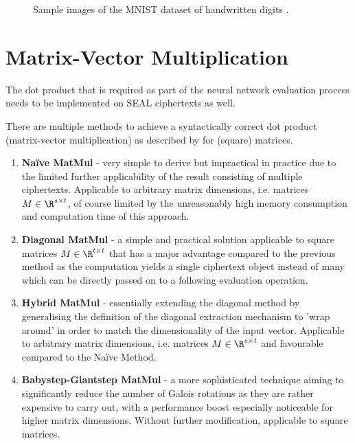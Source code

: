 \begin{figure}[H]
  \centering
  \caption{Sample images of the MNIST dataset of handwritten digits \parencite{mnist-original}.}
\end{figure}

\section{Matrix-Vector Multiplication}
The dot product that is required as part of the neural network evaluation process needs to be implemented on SEAL ciphertexts as well.

There are multiple methods to achieve a syntactically correct dot product (matrix-vector multiplication) as described by \textcite{2018-gazelle} for (square) matrices.

\begin{enumerate}
  \item \textbf{Naïve MatMul} - very simple to derive but impractical in practice due to the limited further
        applicability of the result consisting of multiple ciphertexts. Applicable to arbitrary matrix dimensions,
        i.e. matrices $M \in \R^{s \times t}$, of course limited by the unreasonably high memory consumption
        and computation time of this approach.
  \item \textbf{Diagonal MatMul} - a simple and practical solution applicable to square matrices $M \in \R^{t \times t}$
        that has a major advantage compared to the previous method as the computation yields a
        single ciphertext object instead of many which can be directly passed on to a following evaluation operation.
  \item \textbf{Hybrid MatMul} - essentially extending the diagonal method by generalising the definition of the
        diagonal extraction mechanism to 'wrap around' in order to match the dimensionality of the input vector.
        Applicable to arbitrary matrix dimensions, i.e. matrices $M \in \R^{s \times t}$ and favourable compared
        to the Naïve Method.
  \item \textbf{Babystep-Giantstep MatMul} - a more sophisticated technique aiming to significantly reduce the number of
        Galois rotations as they are rather expensive to carry out,
        with a performance boost especially noticeable for higher matrix dimensions.
        Without further modification, applicable to square matrices.
\end{enumerate}

